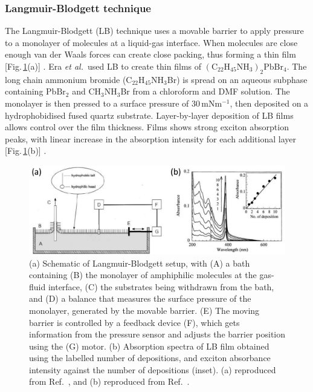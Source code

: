 \subsubsection {Langmuir-Blodgett technique}
The Langmuir-Blodgett (LB) technique uses a movable barrier to apply pressure to a monolayer of molecules at a liquid-gas interface. When molecules are close enough van der Waals forces can create close packing, thus forming a thin film [Fig.\,\ref{2Fig6}(a)] \cite{Mitzi2001b}. Era \textit{et al.}\ used LB to create thin films of $(\textrm{C}_{22}\textrm{H}_{45}\textrm{NH}_3)_2\textrm{PbBr}_4$. The long chain ammonium bromide ($\textrm{C}_{22}\textrm{H}_{45}\textrm{NH}_3$Br) is spread on an aqueous subphase containing Pb$\textrm{Br}_2$ and $\textrm{CH}_3\textrm{NH}_3$Br from a chloroform and DMF solution. The monolayer is then pressed to a surface pressure of 30\,mN$\textrm{m}^{-1}$, then deposited on a hydrophobidised fused quartz substrate. Layer-by-layer deposition of LB films allows control over the film thickness. Films shows strong exciton absorption peaks, with linear increase in the absorption intensity for each additional layer [Fig.\,\ref{2Fig6}(b)] \cite{Era2000}.
\begin{figure} [h!]
\centering
\includegraphics[width=\textwidth]{Fig6}
\caption{(a) Schematic of Langmuir-Blodgett setup, with (A) a bath containing (B) the monolayer of amphiphilic molecules at the gas-fluid interface, (C) the substrates being withdrawn from the bath, and (D) a balance that measures the surface pressure of the monolayer, generated by the movable barrier. (E) The moving barrier is controlled by a feedback device (F), which gets information from the pressure sensor and adjusts the barrier position using the (G) motor. (b) Absorption spectra of LB film obtained using the labelled number of depositions, and exciton absorbance intensity against the number of depositions (inset). (a) reproduced from Ref.\ \cite{Mitzi2001b}, and (b) reproduced from Ref.~\cite{Era2000}.}
\label{2Fig6}
\end{figure}


